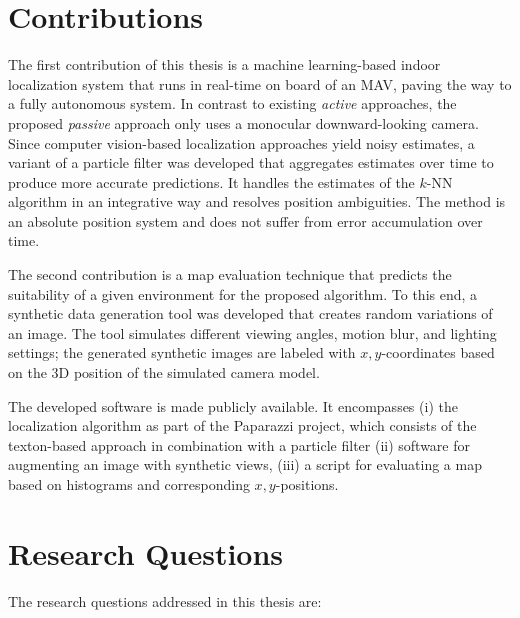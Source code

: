 \documentclass{report}
\begin{document}
\section{Contributions}
\label{sec:contributions}

The first contribution of this thesis is a machine learning-based
indoor localization system that runs in real-time on board of an MAV,
paving the way to a fully autonomous system. In contrast to existing
\emph{active} approaches, the proposed \emph{passive} approach only
uses a monocular downward-looking camera. Since computer vision-based
localization approaches yield noisy estimates, a variant of a particle
filter was developed that aggregates estimates over time to produce
more accurate predictions. It handles the estimates of the $k$-NN
algorithm in an integrative way and resolves position ambiguities. The
method is an absolute position system and does not suffer from error
accumulation over time.

The second contribution is a map evaluation technique that predicts
the suitability of a given environment for the proposed algorithm. To
this end, a synthetic data generation tool was developed that creates
random variations of an image. The tool simulates different viewing
angles, motion blur, and lighting settings; the generated synthetic
images are labeled with $x,y$-coordinates based on the 3D position of
the simulated camera model.

The developed software is made publicly available. It encompasses (i)
the localization algorithm as part of the Paparazzi project, which
consists of the texton-based approach in combination with a particle
filter (ii) software for augmenting an image with synthetic views,
(iii) a script for evaluating a map based on histograms and
corresponding $x,y$-positions.


\section{Research Questions}
\label{sec:researchquestions}

The research questions addressed in this thesis are:
\end{document}
